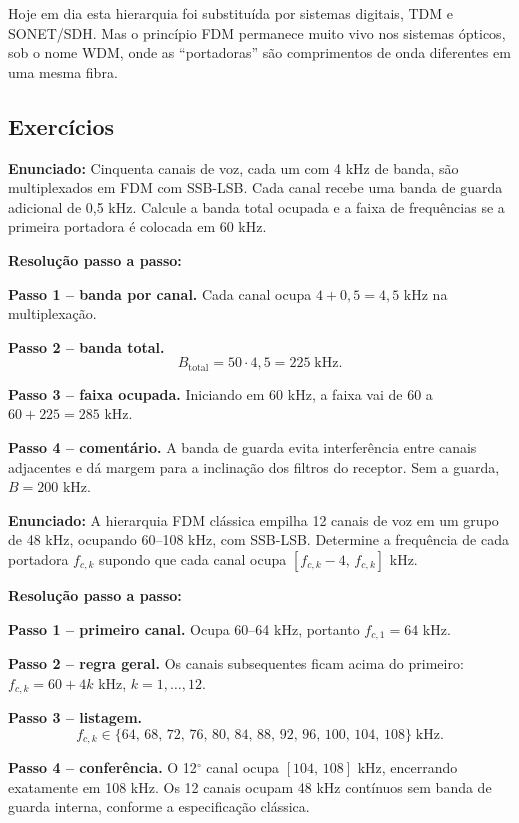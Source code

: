 \documentclass[11pt,a4paper]{article}
\begin{document}
Hoje em dia esta hierarquia foi substituída por sistemas digitais, TDM e SONET/SDH. Mas o princípio FDM permanece muito vivo nos sistemas ópticos, sob o nome WDM, onde as ``portadoras'' são comprimentos de onda diferentes em uma mesma fibra.

\subsection{Exercícios}

\begin{exercicio}
\textbf{Enunciado:} Cinquenta canais de voz, cada um com 4 kHz de banda, são multiplexados em FDM com SSB-LSB. Cada canal recebe uma banda de guarda adicional de 0,5 kHz. Calcule a banda total ocupada e a faixa de frequências se a primeira portadora é colocada em 60 kHz.

\textbf{Resolução passo a passo:}

\textbf{Passo 1 -- banda por canal.}
Cada canal ocupa $4 + 0{,}5 = 4{,}5$ kHz na multiplexação.

\textbf{Passo 2 -- banda total.}
\[
  B_{\text{total}} = 50\!\cdot\!4{,}5 = 225\;\text{kHz}.
\]

\textbf{Passo 3 -- faixa ocupada.}
Iniciando em 60 kHz, a faixa vai de 60 a $60+225=285$ kHz.

\textbf{Passo 4 -- comentário.}
A banda de guarda evita interferência entre canais adjacentes e dá margem para a inclinação dos filtros do receptor. Sem a guarda, $B = 200$ kHz.
\end{exercicio}

\begin{exercicio}
\textbf{Enunciado:} A hierarquia FDM clássica empilha 12 canais de voz em um grupo de 48 kHz, ocupando 60--108 kHz, com SSB-LSB. Determine a frequência de cada portadora $f_{c,k}$ supondo que cada canal ocupa $[f_{c,k}-4,\,f_{c,k}]$ kHz.

\textbf{Resolução passo a passo:}

\textbf{Passo 1 -- primeiro canal.}
Ocupa 60--64 kHz, portanto $f_{c,1}=64$ kHz.

\textbf{Passo 2 -- regra geral.}
Os canais subsequentes ficam acima do primeiro: $f_{c,k} = 60 + 4k$ kHz, $k=1,\ldots,12$.

\textbf{Passo 3 -- listagem.}
\[
  f_{c,k} \in \{64,\,68,\,72,\,76,\,80,\,84,\,88,\,92,\,96,\,100,\,104,\,108\}\;\text{kHz}.
\]

\textbf{Passo 4 -- conferência.}
O 12$^\circ$ canal ocupa $[104,\,108]$ kHz, encerrando exatamente em 108 kHz. Os 12 canais ocupam 48 kHz contínuos sem banda de guarda interna, conforme a especificação clássica.
\end{exercicio}
\end{document}
